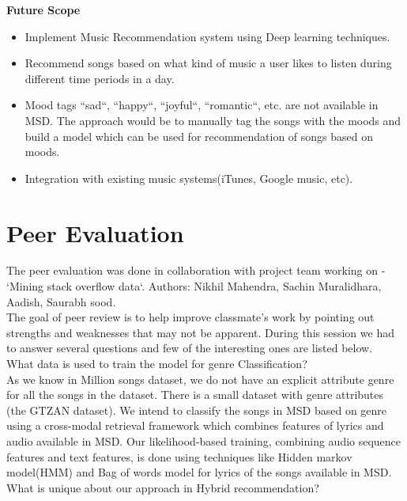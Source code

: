 \documentclass{sig-alternate-05-2015}
\begin{document}
\textbf{Future Scope}
\begin{itemize}
    \item Implement Music Recommendation system using Deep learning techniques.
    \item Recommend songs based on what kind of music a user likes to listen during different time periods in a day.
    \item Mood tags ``sad``, ``happy``, ``joyful``, ``romantic``, etc. are not available in MSD. The approach would be to manually tag the songs with the moods and build a model which can be used for recommendation of songs based on moods. \\
    \item Integration with existing music systems(iTunes, Google music, etc). \\
\end{itemize}

\section{Peer Evaluation}

The peer evaluation was done in collaboration with project team working on - `Mining stack overflow data`. Authors: Nikhil Mahendra, Sachin Muralidhara, Aadish, Saurabh sood.\\

The goal of peer review is to help improve classmate's work by pointing out strengths and weaknesses that may not be apparent. During this session we had to answer several questions and few of the interesting ones are listed below.\\

What data is used to train the model for genre Classification? \\

As we know in Million songs dataset, we do not have an explicit attribute genre for all the songs in the dataset. There is a small dataset with genre attributes (the GTZAN dataset). We intend to classify the songs in MSD based on genre using a cross-modal retrieval framework which combines features of lyrics and audio available in MSD. Our likelihood-based training, combining audio sequence features and text features, is done using techniques like Hidden markov model(HMM) and Bag of words model for lyrics of the songs available in MSD.\\

What is unique about our approach in Hybrid recommendation? \\
\end{document}

